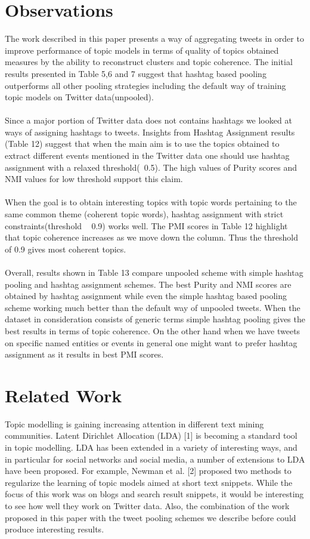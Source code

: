 \documentclass[10pt,a5paper,twoside]{article}
\begin{document}
\section{Observations}
The work described in this paper presents a way of aggregating tweets in order to improve performance of topic models in terms of quality of topics obtained  measures by the ability to reconstruct clusters and topic coherence. The initial results presented in Table 5,6 and 7 suggest that hashtag based pooling outperforms all other pooling strategies including the default way of training topic models on Twitter data(unpooled).
\\\\
Since a major portion of Twitter data does not contains hashtags we looked at ways of assigning hashtags to tweets. Insights from Hashtag Assignment results (Table 12) suggest that when the main aim is to use the topics obtained to extract different events mentioned in the Twitter data one should use hashtag assignment with a relaxed threshold(~0.5). The high values of Purity scores and NMI values for low threshold support this claim.
\\\\
When the goal is to obtain interesting topics with topic words pertaining to the same common theme (coherent topic words), hashtag assignment with strict constraints(threshold ~ 0.9) works well. The PMI scores in Table 12 highlight that topic coherence increases as we move down the column. Thus the threshold of 0.9 gives most coherent topics.
\\\\
Overall, results shown in Table 13 compare unpooled scheme with simple hashtag pooling and hashtag assignment schemes. The best Purity and NMI scores are obtained by hashtag assignment while even the simple hashtag based pooling scheme working much better than the default way of unpooled tweets. When the dataset in consideration consists of generic terms simple hashtag pooling gives the best results in terms of topic coherence. On the other hand when we have tweets on specific named entities or events in general one might want to prefer hashtag assignment as it results in best PMI scores. 
\\


\section{Related Work}
Topic modelling is gaining increasing attention in different text mining communities. Latent Dirichlet Allocation (LDA) [1] is becoming a standard tool in topic modelling. LDA has been extended in a variety of interesting ways, and in particular for social networks and social media, a number of extensions to LDA have been proposed. For example, Newman et al. [2] proposed two methods to regularize the learning of topic models aimed at short text snippets. While the focus of this work was on blogs and search result snippets, it would be interesting to see how well they work on Twitter data. Also, the combination of the work proposed in this paper with the tweet pooling schemes we describe before could produce interesting results.
\end{document}
